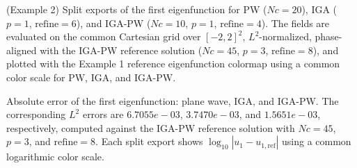 \caption{(Example 2) Split exports of the first eigenfunction for PW ($Nc = 20$), IGA ($p = 1$, $\mathrm{refine} = 6$), and IGA-PW ($Nc = 10$, $p = 1$, $\mathrm{refine} = 4$). The fields are evaluated on the common Cartesian grid over $[-2,2]^2$, $L^2$-normalized, phase-aligned with the IGA-PW reference solution ($Nc = 45$, $p = 3$, $\mathrm{refine} = 8$), and plotted with the Example 1 reference eigenfunction colormap using a common color scale for PW, IGA, and IGA-PW.}

\caption{Absolute error of the first eigenfunction: plane wave, IGA, and IGA-PW. The corresponding $L^2$ errors are $6.7055e-03$, $3.7470e-03$, and $1.5651e-03$, respectively, computed against the IGA-PW reference solution with $Nc = 45$, $p = 3$, and $\mathrm{refine} = 8$. Each split export shows $\log_{10}|u_1-u_{1,\mathrm{ref}}|$ using a common logarithmic color scale.}
